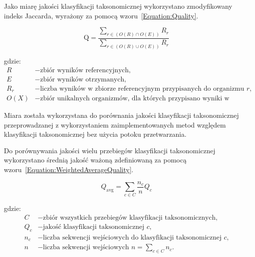 \documentclass{article}
\newcommand{\temporary}[1]{
    \begin{tcolorbox}[colframe=red, colback=white, title={\textbf{WERSJA PO POLSKU}}, sharp corners=south]
        #1
    \end{tcolorbox}
}
\begin{document}
            \temporary{
                Jako miarę jakości klasyfikacji taksonomicznej wykorzystano zmodyfikowany indeks Jaccarda, wyrażony za pomocą wzoru~\ref{Equation:Quality}.

                \begin{equation}
                    \text{Q} = \frac{
                        \sum_{r \in (O(R) \cap O(E))} R_{r}
                    }{
                        \sum_{r \in (O(R) \cup O(E))} R_{r}
                    }
                    \label{Equation:Quality}
                \end{equation}
        
                gdzie:
                \begin{align*}
                    R &- \text{zbiór wyników referencyjnych,} \\
                    E &- \text{zbiór wyników otrzymanych,} \\
                    R_{r} &- \text{liczba wyników w zbiorze referencyjnym przypisanych do organizmu $r$,} \\
                    O(X) &- \text{zbiór unikalnych organizmów, dla których przypisano wyniki w zbiorze X. }
                \end{align*}
        
                Miara została wykorzystana do porównania jakości klasyfikacji taksonomicznej przeprowadzanej z wykorzystaniem zaimplementowanych metod względem klasyfikacji taksonomicznej bez użycia potoku przetwarzania.
        
                Do porównywania jakości wielu przebiegów klasyfikacji taksonomicznej wykorzystano średnią jakość ważoną zdefiniowaną za pomocą wzoru~\ref{Equation:WeightedAverageQuality}.
        
                \begin{equation}
                    Q_{\text{avg}} = \sum_{c \in C} \frac{n_c}{n} Q_c
                    \label{Equation:WeightedAverageQuality}
                \end{equation}
        
                gdzie:
                \begin{align*}
                  C &- \text{zbiór wszystkich przebiegów klasyfikacji taksonomicznych,} \\
                  Q_c &- \text{jakość klasyfikacji taksonomicznej $c$,} \\
                  n_c &- \text{liczba sekwencji wejściowych do klasyfikacji taksonomicznej $c$,}\\
                  n   &- \text{liczba sekwencji wejściowych $n = \sum_{c \in C} n_{c}.$}
                \end{align*}
        
}
\end{document}
